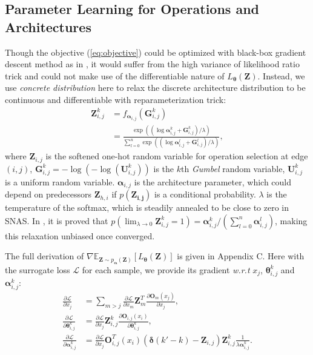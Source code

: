 \documentclass{article} \usepackage{iclr2019_conference,times}
\newcommand{\zh}{\color{black}}
\begin{document}
\subsection{Parameter Learning for Operations and Architectures}
Though the objective (\ref{eq:objective}) could be optimized with black-box gradient descent method as in \citet{ranganath2014black}, it would suffer from the high variance of likelihood ratio trick \citep{williams1992simple} and could not make use of the differentiable nature of $L_{\bm{\theta}}(\bm{Z})$. {\zh Instead}, we use \textit{concrete distribution} \citep{maddison2016concrete} here to relax the discrete architecture distribution to be continuous and differentiable with reparameterization trick:
\begin{equation}
\begin{split}
\label{eq:gumbelsoftmax}
\bm{Z}_{i, j}^{k} &= f_{\bm{\alpha}_{i, j}}(\bm{G}_{i, j}^{k})\\
&= \frac{\exp ((\log \bm{\alpha}_{i, j}^{k} + \bm{G}_{i, j}^{k})/\lambda)}{\sum_{l=0}^{n}\exp ((\log \bm{\alpha}_{i, j}^{l} + \bm{G}_{i, j}^{l})/\lambda)}, 
\end{split}
\end{equation}
where $\bm{Z}_{i, j}$ is the softened one-hot random variable for operation selection at edge $(i, j)$, $\bm{G}_{i, j}^{k} = -\log (-\log (\bm{U}_{i, j}^{k}))$ is the $k$th \textit{Gumbel} random variable, $\bm{U}_{i, j}^{k}$ is a uniform random variable. $\bm{\alpha}_{i,j}$ is the architecture parameter, which could depend on predecessors $\bm{Z}_{h,i}$ if $p(\bm{Z_{i,j}})$ is a conditional probability. $\lambda$ is the temperature of the softmax, which is steadily annealed to be close to zero in SNAS. In \citet{maddison2016concrete}, it is proved that $p(\lim_{\lambda\to0} \bm{Z}_{i, j}^{k} = 1) = \bm{\alpha}_{i, j}^{k} / (\sum_{l=0}^{n}\bm{\alpha}_{i, j}^{l})$, making this relaxation unbiased once converged. 

The full derivation of $\nabla\mathbb{E}_{\bm{Z}\sim p_{\bm{\alpha}}(\bm{Z})}[L_{\bm{\theta}}(\bm{Z})]$ is given in Appendix C. Here with the surrogate loss $\mathcal{L}$ for each sample, we provide its gradient \textit{w.r.t} $x_{j}$, $\bm{\theta}_{i, j}^{k}$ and $\bm{\alpha}_{i, j}^{k}$: 
\begin{equation}
\begin{split}
\frac{\partial \mathcal{L}}{\partial x_{j}} &= \sum_{m>j}\frac{\partial \mathcal{L}}{\partial x_{m}}\bm{Z}_{m}^{T} \frac{\partial \bm{O}_{m}(x_{j})}{\partial x_{j}}, \\
\frac{\partial \mathcal{L}}{\partial \bm{\theta}_{i, j}^{k}} &= \frac{\partial \mathcal{L}}{\partial x_{j}}\bm{Z}_{i, j}^{k} \frac{\partial \bm{O}_{i, j}(x_{i})}{\partial \bm{\theta}_{i, j}^{k}}, \\
\frac{\partial \mathcal{L}}{\partial \bm{\alpha}_{i, j}^{k}} &= \frac{\partial \mathcal{L}}{\partial x_{j}}\bm{O}_{i, j}^{T}(x_{i}) (\bm{\delta}(k'-k)-\bm{Z}_{i, j})\bm{Z}_{i, j}^{k}\frac{1}{\lambda\bm{\alpha}_{i, j}^{k}}.
\end{split}
\end{equation}
\end{document}
